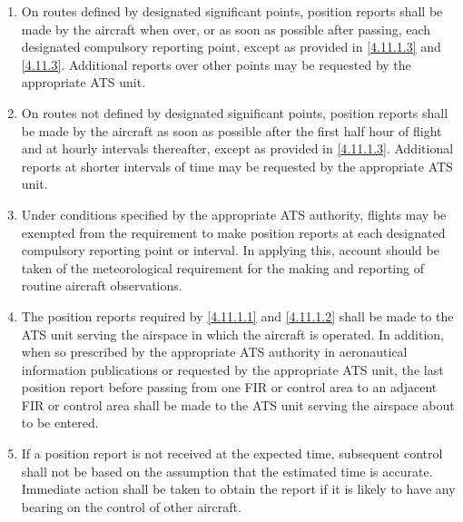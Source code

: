 \documentclass[../main.tex]{subfiles}
\begin{document}
    \begin{enumerate}
        \item \label{4.11.1.1} On routes defined by designated significant points, position reports shall be made by the aircraft when over, or as soon as possible after passing, each designated compulsory reporting point, except as provided in \ref{4.11.1.3} and \ref{4.11.3}. Additional reports over other points may be requested by the appropriate ATS unit.
        \item \label{4.11.1.2} On routes not defined by designated significant points, position reports shall be made by the aircraft as soon as possible after the first half hour of flight and at hourly intervals thereafter, except as provided in \ref{4.11.1.3}. Additional reports at shorter intervals of time may be requested by the appropriate ATS unit.
        \item \label{4.11.1.3} Under conditions specified by the appropriate ATS authority, flights may be exempted from the requirement to make position reports at each designated compulsory reporting point or interval. In applying this, account should be taken of the meteorological requirement for the making and reporting of routine aircraft observations.


        \item The position reports required by \ref{4.11.1.1} and \ref{4.11.1.2} shall be made to the ATS unit serving the airspace in which the aircraft is operated. In addition, when so prescribed by the appropriate ATS authority in aeronautical information publications or requested by the appropriate ATS unit, the last position report before passing from one FIR or control area to an adjacent FIR or control area shall be made to the ATS unit serving the airspace about to be entered.
        \item If a position report is not received at the expected time, subsequent control shall not be based on the assumption that the estimated time is accurate. Immediate action shall be taken to obtain the report if it is likely to have any bearing on the control of other aircraft.
    \end{enumerate}
\end{document}
